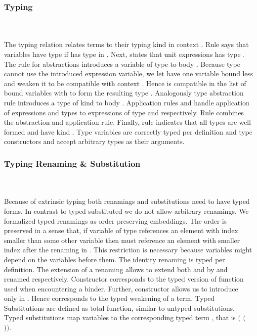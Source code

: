 \subsubsection{Typing}\hfill\\\\
The typing relation    \Data{:}  relates terms  to their typing kind  in context .
\FTyping
Rule  says that variables   have type  if  has type  in . Next,  states that unit expressions  has type . 
The rule for abstractions  introduces a variable of type  to body . 
Because type  cannot use the introduced expression variable, we let  have one variable bound less and weaken it to be compatible with context   . 
Hence  is compatible in the list of bound variables  with  to form the resulting type   . 
Analogously type abstraction rule  introduces a type of kind  to body . 
Application rules  and  handle application of expressions and types to expressions of type    and   respectively. Rule  combines the abstraction and application rule.
Finally, rule  indicates that all types  are well formed and have kind . Type variables are correctly typed per definition and type constructors  and  accept arbitrary types as their arguments.

\subsubsection{Typing Renaming \& Substitution}\hfill\\\\
Because of extrinsic typing both renamings and substitutions need to have typed forms. 
In contrast to typed substituted we do not allow arbitrary renamings. We formalized typed renamings as order preserving embeddings. 
The order is preserved in a sense that, if variable  of type    references an element with index smaller than some other variable  then  must reference an element with smaller index after the renaming in .
This restriction is necessary because variables might depend on the variables before them.
\FRenTyping
The identity renaming  is typed per definition. The extension of a renaming  allows to extend both  and  by  and renamed  respectively. Constructor  corresponds to the typed version of function  used when encountering a binder. Further, constructor  allows us to introduce  only in . Hence  corresponds to the typed weakening of a term.
Typed Substitutions are defined as total function, similar to untyped substitutions.
\FSubTyping
Typed substitutions  map variables  to the corresponding typed term , that is     \Data{:} $($  $($  $))$. 
